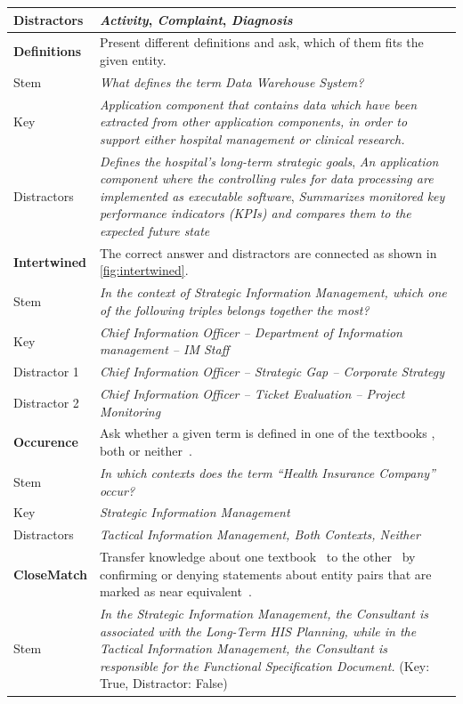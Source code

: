 \documentclass{IOS-Book-Article}     %
\newcommand{\citep}{\cite}%
\begin{document}
\begin{table}[h]
\begin{tabulary}{\columnwidth}{lL}
Distractors				&\emph{Activity}, \emph{Complaint}, \emph{Diagnosis}\\
\midrule
\textbf{Definitions}	&Present different definitions and ask, which of them fits the given entity.\\
Stem					&\emph{What defines the term Data Warehouse System?}\\
Key						&\emph{Application component that contains data which have been extracted from other application components, in order to support either hospital management or clinical research.}\\
Distractors				&\emph{Defines the hospital’s long-term strategic goals},
						\emph{An application component where the controlling rules for data processing are implemented as executable software},
						\emph{Summarizes monitored key performance indicators (KPIs) and compares them to the expected future state}\\
\midrule
\textbf{Intertwined}	&The correct answer and distractors are connected as shown in \cref{fig:intertwined}.\\
Stem					&\emph{In the context of Strategic Information Management, which one of the following triples belongs together the most?}\\
Key						&\emph{Chief Information Officer -- Department of Information management -- IM Staff}\\
Distractor 1			&\emph{Chief Information Officer -- Strategic Gap -- Corporate Strategy}\\
Distractor 2			&\emph{Chief Information Officer -- Ticket Evaluation -- Project Monitoring}\\
\midrule
\textbf{Occurence}		&Ask whether a given term is defined in one of the textbooks \cite{bb,ob}, both or neither~\citep{snikquizba}.\\
Stem					&\emph{In which contexts does the term \enquote{Health Insurance Company} occur?}\\
Key						&\emph{Strategic Information Management}\\
Distractors				&\emph{Tactical Information Management, Both Contexts, Neither}\\
\midrule
\textbf{CloseMatch}		&Transfer knowledge about one textbook~\citep{bb} to the other~\citep{ob} by confirming or denying statements about entity pairs that are marked as near equivalent~\citep{snikquizba}.\\
Stem					&\emph{In the Strategic Information Management, the Consultant is associated with the Long-Term HIS Planning, while in the Tactical Information Management, the Consultant is responsible for the Functional Specification Document.} (Key: True, Distractor: False)\\
\bottomrule
\end{tabulary}
\end{table}
\end{document}
